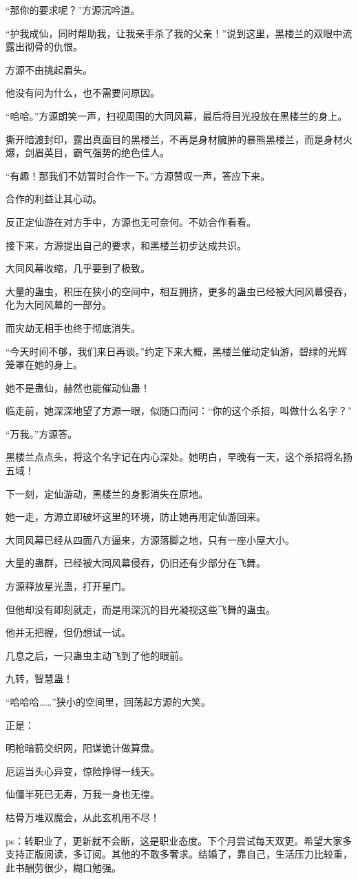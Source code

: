 \begin{this_body}
“那你的要求呢？”方源沉吟道。

“护我成仙，同时帮助我，让我亲手杀了我的父亲！”说到这里，黑楼兰的双眼中流露出彻骨的仇恨。

方源不由挑起眉头。

他没有问为什么，也不需要问原因。

“哈哈。”方源朗笑一声，扫视周围的大同风幕，最后将目光投放在黑楼兰的身上。

撕开暗渡封印，露出真面目的黑楼兰，不再是身材臃肿的暴熊黑楼兰，而是身材火爆，剑眉英目，霸气强势的绝色佳人。

“有趣！那我们不妨暂时合作一下。”方源赞叹一声，答应下来。

合作的利益让其心动。

反正定仙游在对方手中，方源也无可奈何。不妨合作看看。

接下来，方源提出自己的要求，和黑楼兰初步达成共识。

大同风幕收缩，几乎要到了极致。

大量的蛊虫，积压在狭小的空间中，相互拥挤，更多的蛊虫已经被大同风幕侵吞，化为大同风幕的一部分。

而灾劫无相手也终于彻底消失。

“今天时间不够，我们来日再谈。”约定下来大概，黑楼兰催动定仙游，碧绿的光辉笼罩在她的身上。

她不是蛊仙，赫然也能催动仙蛊！

临走前，她深深地望了方源一眼，似随口而问：“你的这个杀招，叫做什么名字？”

“万我。”方源答。

黑楼兰点点头，将这个名字记在内心深处。她明白，早晚有一天，这个杀招将名扬五域！

下一刻，定仙游动，黑楼兰的身影消失在原地。

她一走，方源立即破坏这里的环境，防止她再用定仙游回来。

大同风幕已经从四面八方逼来，方源落脚之地，只有一座小屋大小。

大量的蛊群，已经被大同风幕侵吞，仍旧还有少部分在飞舞。

方源释放星光蛊，打开星门。

但他却没有即刻就走，而是用深沉的目光凝视这些飞舞的蛊虫。

他并无把握，但仍想试一试。

几息之后，一只蛊虫主动飞到了他的眼前。

九转，智慧蛊！

“哈哈哈……”狭小的空间里，回荡起方源的大笑。

正是：

明枪暗箭交织网，阳谋诡计做算盘。

厄运当头心异变，惊险挣得一线天。

仙僵半死已无寿，万我一身也无徨。

枯骨万堆双魔会，从此玄机用不尽！

ps：转职业了，更新就不会断，这是职业态度。下个月尝试每天双更。希望大家多支持正版阅读，多订阅。其他的不敢多奢求。结婚了，靠自己，生活压力比较重，此书酬劳很少，糊口勉强。

\end{this_body}

